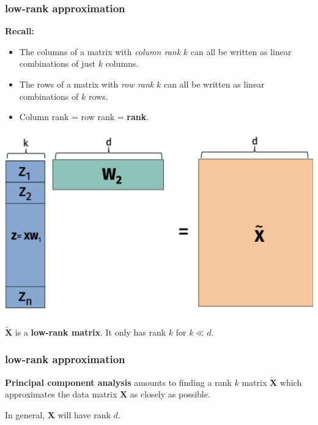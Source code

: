 \documentclass[handout,compress]{beamer}
\newcommand{\bv}[1]{\mathbf{#1}}
\begin{document}
\begin{frame}
	\frametitle{low-rank approximation}
	\small
	\textbf{Recall:} \vspace{-.5em}
	
	\begin{itemize}
		\item The columns of a matrix with \emph{column rank} $k$ can all be written as linear combinations of just $k$ columns.\vspace{-.25em}
		\item The rows of a matrix with \emph{row rank} $k$ can all be written as linear combinations of $k$ rows.\vspace{-.25em}
		\item  Column rank = row rank = \textbf{rank}.\vspace{-.25em}
	\end{itemize} 
\vspace{-1em}
	\begin{center}
		\includegraphics[width=.6\textwidth]{lowranktilde.png}
		
		$\tilde{\bv{X}}$ is a \alert{\textbf{low-rank matrix}}. It only has rank $k$ for $k \ll d$.
	\end{center}
\end{frame}

\begin{frame}
	\frametitle{low-rank approximation}
	\textbf{Principal component analysis} amounts to finding a rank $k$ matrix $\tilde{\bv{X}}$ which approximates the data matrix $\bv{X}$ as closely as possible. 
	
	In general, $\bv{X}$ will have rank $d$. 
\end{frame}
\end{document}
